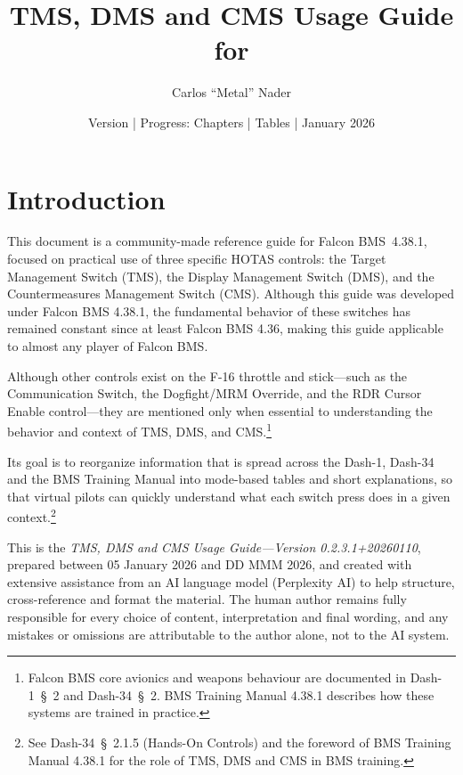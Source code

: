 \documentclass[11pt,a4paper]{article}
\title{TMS, DMS and CMS Usage Guide for \bmsver}
\author{Carlos ``Metal'' Nader}
\date{Version \fulldocversion{} | Progress: Chapters \chapterscompletedof{} | Tables \tablesfilledpct{} | January 2026}
\providecommand{\dashref}[1]{Dash-34~\S~#1}
\providecommand{\dashone}[1]{Dash-1~\S~#1}
\providecommand{\trnman}{BMS Training Manual 4.38.1}
\providecommand{\bmsver}{Falcon BMS~4.38.1}
\newcommand{\docversion}{0.2.3.1}
\newcommand{\docbuild}{20260110}
\newcommand{\docstartdate}{05 January 2026}
\newcommand{\docenddate}{DD MMM 2026}
\newcommand{\fulldocversion}{\docversion+\docbuild}
\begin{document}
\maketitle

\newpage
\tableofcontents
\newpage
{}

\section{Introduction}

This document is a community-made reference guide for \bmsver, focused on practical use of three specific HOTAS controls: the Target Management Switch (TMS), the Display Management Switch (DMS), and the Countermeasures Management Switch (CMS). Although this guide was developed under Falcon BMS 4.38.1, the fundamental behavior of these switches has remained constant since at least Falcon BMS 4.36, making this guide applicable to almost any player of Falcon BMS.

Although other controls exist on the F-16 throttle and stick---such as the Communication Switch, the Dogfight/MRM Override, and the RDR Cursor Enable control---they are mentioned only when essential to understanding the behavior and context of TMS, DMS, and CMS.\footnote{Falcon BMS core avionics and weapons behaviour are documented in \dashone{2} and \dashref{2}. \trnman{} describes how these systems are trained in practice.}

Its goal is to reorganize information that is spread across the Dash-1, Dash-34 and the BMS Training Manual into mode-based tables and short explanations, so that virtual pilots can quickly understand what each switch press does in a given context.\footnote{See \dashref{2.1.5} (Hands-On Controls) and the foreword of \trnman{} for the role of TMS, DMS and CMS in BMS training.}

This is the \emph{TMS, DMS and CMS Usage Guide---Version \fulldocversion}, prepared between \docstartdate{} and \docenddate{}, and created with extensive assistance from an AI language model (Perplexity AI) to help structure, cross-reference and format the material. The human author remains fully responsible for every choice of content, interpretation and final wording, and any mistakes or omissions are attributable to the author alone, not to the AI system.
\end{document}
